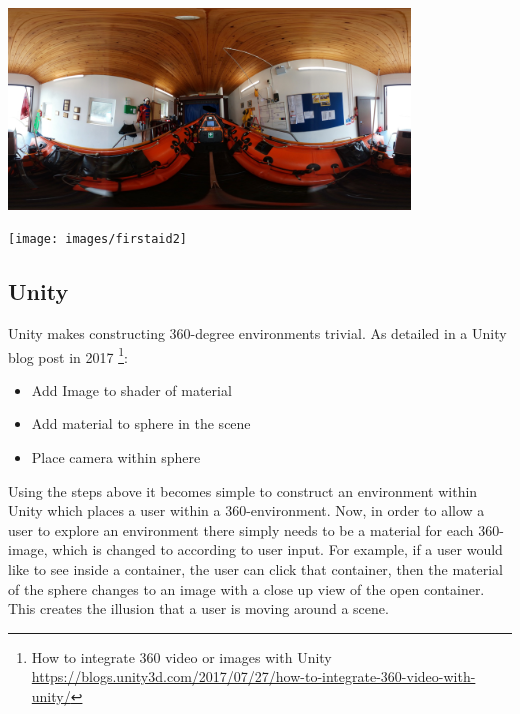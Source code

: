 \documentclass[a4paper, openright, twoside]{book}
\begin{document}
\begin{minipage}{\textwidth}
\hfill \break
\centering
\includegraphics[width=0.8\textwidth]{images/centre}
\label{model}
\hfill \break
\end{minipage}

\begin{minipage}{\textwidth}
\hfill \break
\centering
\texttt{[image: images/firstaid2]}
\label{model}
\hfill \break
\end{minipage}


\subsection{Unity}
Unity makes constructing 360-degree environments trivial. As detailed in a Unity blog post in 2017 \footnote{How to integrate 360 video or images with Unity \url{https://blogs.unity3d.com/2017/07/27/how-to-integrate-360-video-with-unity/}}: 

\begin{itemize}
\item Add Image to shader of material
\item Add material to sphere in the scene
\item Place camera within sphere
\end{itemize}

Using the steps above it becomes simple to construct an environment within Unity which places a user within a 360-environment. Now, in order to allow a user to explore an environment there simply needs to be a material for each 360-image, which is changed to according to user input. For example, if a user would like to see inside a container, the user can click that container, then the material of the sphere changes to an image with a close up view of the open container. This creates the illusion that a user is moving around a scene. 
\end{document}
